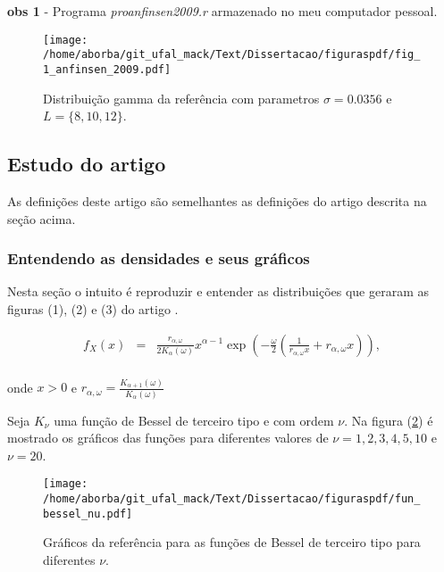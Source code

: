 \documentclass[10pt,a4paper]{article}
\begin{document}
{\bf obs 1} - Programa {\it proanfinsen2009.r} armazenado no meu computador pessoal.

\begin{figure}[!h]
\centering
\texttt{[image: /home/aborba/git\_ufal\_mack/Text/Dissertacao/figuraspdf/fig\_1\_anfinsen\_2009.pdf]}
	\caption{Distribuição gamma da referência \cite{anfinsen2009} com parametros $\sigma=0.0356$ e $L=\{8,10,12\}$.}
\label{sec41fig1}
\end{figure}

\subsection{Estudo do artigo  \cite{freitas_frery_2005}}

As definições deste artigo são semelhantes as definições do artigo \cite{anfinsen2009} descrita na seção acima. 

\subsubsection{ Entendendo as densidades e seus gráficos}

Nesta seção o intuito é reproduzir e entender as distribuições que geraram as figuras (1), (2) e (3) do artigo \cite{freitas_frery_2005}. 

\begin{equation}\label{sec51eqn1}
\begin{array}{ccc}
	f_{X}(x)&=&\frac{r_{\alpha,\omega}}{2K_{\alpha}(\omega)}x^{\alpha-1}\exp\left(-\frac{\omega}{2}\left(\frac{1}{r_{\alpha,\omega}x}+ r_{\alpha,\omega}x\right)\right), \\
\end{array}
\end{equation}

onde $x>0$  e $r_{\alpha,\omega}=\frac{K_{\alpha+1}(\omega)}{K_{\alpha}(\omega)}$

Seja $K_{\nu}$ uma função de Bessel de terceiro tipo e com ordem $\nu$. Na figura (\ref{sec51fig1}) é mostrado os gráficos das funções para diferentes valores de $\nu=1,2,3,4,5,10$ e $\nu=20$. 
\begin{figure}[!htb]
\centering
\texttt{[image: /home/aborba/git\_ufal\_mack/Text/Dissertacao/figuraspdf/fun\_bessel\_nu.pdf]}
	\caption{Gráficos da referência \cite{freitas_frery_2005} para as funções de Bessel de terceiro tipo para diferentes $\nu$.}
\label{sec51fig1}
\end{figure}
\end{document}
